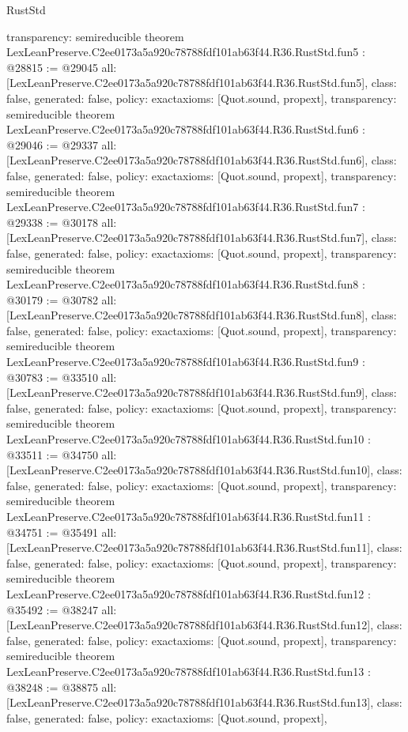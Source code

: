 \begin{lexlean}{RustStd}
\begin{coremodule}
{  transparency: semireducible
}
theorem LexLeanPreserve.C2ee0173a5a920c78788fdf101ab63f44.R36.RustStd.fun5 : @28815 := @29045 {
  all: [LexLeanPreserve.C2ee0173a5a920c78788fdf101ab63f44.R36.RustStd.fun5],
  class: false,
  generated: false,
  policy: exact{axioms: [Quot.sound, propext]},
  transparency: semireducible
}
theorem LexLeanPreserve.C2ee0173a5a920c78788fdf101ab63f44.R36.RustStd.fun6 : @29046 := @29337 {
  all: [LexLeanPreserve.C2ee0173a5a920c78788fdf101ab63f44.R36.RustStd.fun6],
  class: false,
  generated: false,
  policy: exact{axioms: [Quot.sound, propext]},
  transparency: semireducible
}
theorem LexLeanPreserve.C2ee0173a5a920c78788fdf101ab63f44.R36.RustStd.fun7 : @29338 := @30178 {
  all: [LexLeanPreserve.C2ee0173a5a920c78788fdf101ab63f44.R36.RustStd.fun7],
  class: false,
  generated: false,
  policy: exact{axioms: [Quot.sound, propext]},
  transparency: semireducible
}
theorem LexLeanPreserve.C2ee0173a5a920c78788fdf101ab63f44.R36.RustStd.fun8 : @30179 := @30782 {
  all: [LexLeanPreserve.C2ee0173a5a920c78788fdf101ab63f44.R36.RustStd.fun8],
  class: false,
  generated: false,
  policy: exact{axioms: [Quot.sound, propext]},
  transparency: semireducible
}
theorem LexLeanPreserve.C2ee0173a5a920c78788fdf101ab63f44.R36.RustStd.fun9 : @30783 := @33510 {
  all: [LexLeanPreserve.C2ee0173a5a920c78788fdf101ab63f44.R36.RustStd.fun9],
  class: false,
  generated: false,
  policy: exact{axioms: [Quot.sound, propext]},
  transparency: semireducible
}
theorem LexLeanPreserve.C2ee0173a5a920c78788fdf101ab63f44.R36.RustStd.fun10 : @33511 := @34750 {
  all: [LexLeanPreserve.C2ee0173a5a920c78788fdf101ab63f44.R36.RustStd.fun10],
  class: false,
  generated: false,
  policy: exact{axioms: [Quot.sound, propext]},
  transparency: semireducible
}
theorem LexLeanPreserve.C2ee0173a5a920c78788fdf101ab63f44.R36.RustStd.fun11 : @34751 := @35491 {
  all: [LexLeanPreserve.C2ee0173a5a920c78788fdf101ab63f44.R36.RustStd.fun11],
  class: false,
  generated: false,
  policy: exact{axioms: [Quot.sound, propext]},
  transparency: semireducible
}
theorem LexLeanPreserve.C2ee0173a5a920c78788fdf101ab63f44.R36.RustStd.fun12 : @35492 := @38247 {
  all: [LexLeanPreserve.C2ee0173a5a920c78788fdf101ab63f44.R36.RustStd.fun12],
  class: false,
  generated: false,
  policy: exact{axioms: [Quot.sound, propext]},
  transparency: semireducible
}
theorem LexLeanPreserve.C2ee0173a5a920c78788fdf101ab63f44.R36.RustStd.fun13 : @38248 := @38875 {
  all: [LexLeanPreserve.C2ee0173a5a920c78788fdf101ab63f44.R36.RustStd.fun13],
  class: false,
  generated: false,
  policy: exact{axioms: [Quot.sound, propext]},
}
\end{coremodule}
\end{lexlean}
